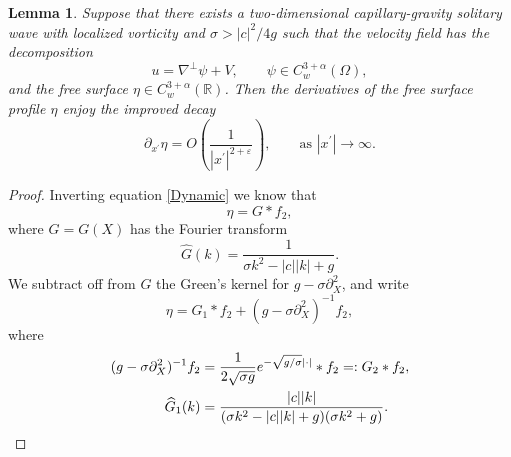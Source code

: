 \documentclass[11pt,reqno]{amsart}
\newcommand{\R}{\mathbb{R}}
\newcommand{\abs}[2][]{#1\lvert #2 #1\rvert}
\theoremstyle{plain}
\newtheorem{lemma}[theorem]{Lemma}
\theoremstyle{remark}
\numberwithin{equation}{section}
\begin{document}
\begin{lemma} \label{improved derivative decay lemma} 
Suppose that there exists a two-dimensional capillary-gravity solitary wave with localized vorticity and $\sigma > \abs c^2/4g$ such that the velocity field has the decomposition
 \[ u = \nabla^\perp \psi + V, \qquad \psi \in C_w^{3+\alpha}(\Omega),\]
 and the free surface $\eta \in C_w^{3+\alpha}(\R)$. Then the derivatives of the free surface profile $\eta$ enjoy the improved decay 
 \begin{equation}
   \partial_{x^\prime} \eta = O\left( \frac{1}{|x^\prime|^{2+\varepsilon} }\right), \qquad \textrm{as } |x^\prime| \to \infty.
   \label{higher derivatives better decay eta} 
 \end{equation}
\end{lemma}
\begin{proof}
Inverting equation \eqref{Dynamic} we know that 
\begin{equation*}
\eta = G \ast f_2,
\end{equation*}
where $G = G(X)$ has the Fourier transform
\begin{equation*}
\widehat{G}(k) = \frac{1}{\sigma k^2 - |c||k| + g}.
\end{equation*}
We subtract off from $G$ the Green's kernel for $g - \sigma \partial^2_X$, and write 
\begin{equation*}
\eta = G_1 \ast f_2 + (g - \sigma \partial^2_X)^{-1} f_2,
\end{equation*}
where
\begin{align*}
(g - \sigma \partial^2_X)^{-1} f_2 & = {1\over 2\sqrt{\sigma g}} e^{-\sqrt{g/\sigma} |\cdot|} \ast f_2 =: G_2 * f_2, \\
\widehat{G}_1(k) & = {|c||k| \over (\sigma k^2 - |c||k| + g) (\sigma k^2 + g)}.
\end{align*}


\end{proof}
\end{document}
